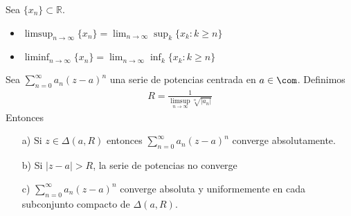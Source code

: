 \begin{defi}
Sea $\{x_n\} \subset \mathbb{R}$.
\begin{itemize}
    \item $\limsup_{n \to \infty}{\{x_n\}} = \lim_{n \to \infty}{\sup_{k}{\{x_k : k \ge n \}}}$
    \item $\liminf_{n \to \infty}{\{x_n\}} = \lim_{n \to \infty}{\inf_{k}{\{x_k : k \ge n \}}}$
\end{itemize}
\end{defi}

\begin{teo}
Sea $\sum_{n=0}^{\infty}{a_n(z-a)^n}$ una serie de potencias centrada en $a \in \com$. Definimos
\begin{align*}
    R = \frac{1}{\limsup_{n \to \infty}{\sqrt[n]{|a_n|}}}
\end{align*}
Entonces
\begin{enumerate}
    \item[a)] Si $z \in \Delta(a,R)$ entonces $\sum_{n=0}^{\infty}{a_n(z-a)^n}$ converge absolutamente.
    \item[b)] Si $|z-a| > R$, la serie de potencias no converge
    \item[c)] $\sum_{n=0}^{\infty}{a_n(z-a)^n}$ converge absoluta y uniformemente en cada subconjunto compacto de $\Delta(a,R)$.
\end{enumerate}
\end{teo}

